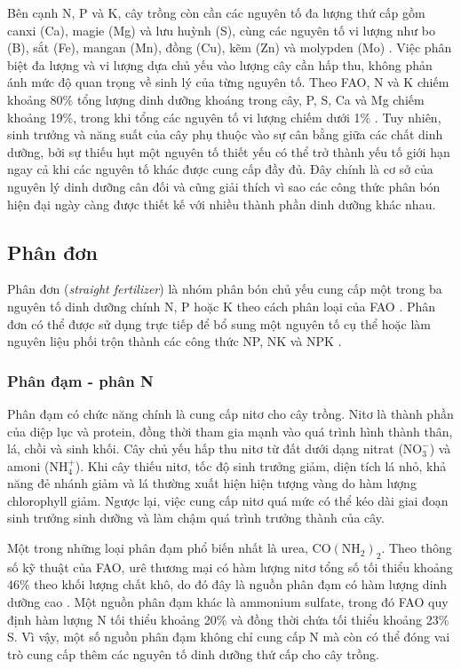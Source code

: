 Bên cạnh N, P và K, cây trồng còn cần các nguyên tố đa lượng thứ cấp gồm canxi (Ca), magie (Mg) và lưu huỳnh (S), cùng các nguyên tố vi lượng như bo (B), sắt (Fe), mangan (Mn), đồng (Cu), kẽm (Zn) và molypden (Mo) \cite{fao-plant-nutrition}. 
Việc phân biệt đa lượng và vi lượng dựa chủ yếu vào lượng cây cần hấp thu, không phản ánh mức độ quan trọng về sinh lý của từng nguyên tố. \cite{fao-plant-nutrition}
Theo FAO, N và K chiếm khoảng 80\% tổng lượng dinh dưỡng khoáng trong cây, P, S, Ca và Mg chiếm khoảng 19\%, trong khi tổng các nguyên tố vi lượng chiếm dưới 1\% \cite{fao-plant-nutrition}.
Tuy nhiên, sinh trưởng và năng suất của cây phụ thuộc vào sự cân bằng giữa các chất dinh dưỡng, bởi sự thiếu hụt một nguyên tố thiết yếu có thể trở thành yếu tố giới hạn ngay cả khi các nguyên tố khác được cung cấp đầy đủ.  
Đây chính là cơ sở của nguyên lý dinh dưỡng cân đối và cũng giải thích vì sao các công thức phân bón hiện đại ngày càng được thiết kế với nhiều thành phần dinh dưỡng khác nhau.

\subsection{Phân đơn}
Phân đơn (\textit{straight fertilizer}) là nhóm phân bón chủ yếu cung cấp một trong ba nguyên tố dinh dưỡng chính N, P hoặc K theo cách phân loại của FAO \cite{fao-fertilizer-specifications}.
Phân đơn có thể được sử dụng trực tiếp để bổ sung một nguyên tố cụ thể hoặc làm nguyên liệu phối trộn thành các công thức NP, NK và NPK \cite{fao-fertilizer-specifications}.

\subsubsection{Phân đạm - phân N}
Phân đạm có chức năng chính là cung cấp nitơ cho cây trồng. 
Nitơ là thành phần của diệp lục và protein, đồng thời tham gia mạnh vào quá trình hình thành thân, lá, chồi và sinh khối. 
Cây chủ yếu hấp thu nitơ từ đất dưới dạng nitrat (\(\mathrm{NO_3^-}\)) và amoni (\(\mathrm{NH_4^+}\)).
Khi cây thiếu nitơ, tốc độ sinh trưởng giảm, diện tích lá nhỏ, khả năng đẻ nhánh giảm và lá thường xuất hiện hiện tượng vàng do hàm lượng chlorophyll giảm. 
Ngược lại, việc cung cấp nitơ quá mức có thể kéo dài giai đoạn sinh trưởng sinh dưỡng và làm chậm quá trình trưởng thành của cây. \cite{fao-plant-nutrition}

Một trong những loại phân đạm phổ biến nhất là urea, \(\mathrm{CO(NH_2)_2}\).
Theo thông số kỹ thuật của FAO, urê thương mại có hàm lượng nitơ tổng số tối thiểu khoảng 46\% theo khối lượng chất khô, do đó đây là nguồn phân đạm có hàm lượng dinh dưỡng cao \cite{fao-fertilizer-specifications}.
Một nguồn phân đạm khác là ammonium sulfate, trong đó FAO quy định hàm lượng N tối thiểu khoảng 20\% và đồng thời chứa tối thiểu khoảng 23\% S. \cite{fao-fertilizer-specifications}
Vì vậy, một số nguồn phân đạm không chỉ cung cấp N mà còn có thể đóng vai trò cung cấp thêm các nguyên tố dinh dưỡng thứ cấp cho cây trồng.

